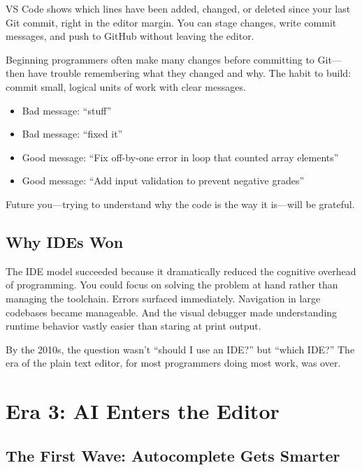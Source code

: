 \documentclass[11pt,letterpaper]{article}
\begin{document}
VS Code shows which lines have been added, changed, or deleted since your last Git commit, right in the editor margin. You can stage changes, write commit messages, and push to GitHub without leaving the editor.

\begin{tipbox}
Beginning programmers often make many changes before committing to Git---then have trouble remembering what they changed and why. The habit to build: commit small, logical units of work with clear messages.

\begin{itemize}[itemsep=2pt]
    \item Bad message: ``stuff''
    \item Bad message: ``fixed it''
    \item Good message: ``Fix off-by-one error in loop that counted array elements''
    \item Good message: ``Add input validation to prevent negative grades''
\end{itemize}
Future you---trying to understand why the code is the way it is---will be grateful.
\end{tipbox}

\subsection{Why IDEs Won}

The IDE model succeeded because it dramatically reduced the cognitive overhead of programming. You could focus on solving the problem at hand rather than managing the toolchain. Errors surfaced immediately. Navigation in large codebases became manageable. And the visual debugger made understanding runtime behavior vastly easier than staring at print output.

By the 2010s, the question wasn't ``should I use an IDE?'' but ``which IDE?'' The era of the plain text editor, for most programmers doing most work, was over.

\section{Era 3: AI Enters the Editor}

\subsection{The First Wave: Autocomplete Gets Smarter}
\end{document}
